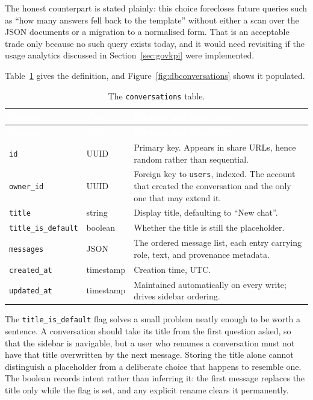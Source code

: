 The honest counterpart is stated plainly: this choice forecloses future queries such as
``how many answers fell back to the template'' without either a scan over the JSON documents
or a migration to a normalised form. That is an acceptable trade only because no such query
exists today, and it would need revisiting if the usage analytics discussed in
Section~\ref{sec:govkpi} were implemented.

Table~\ref{tab:convschema} gives the definition, and Figure~\ref{fig:dbconversations} shows
it populated.

\begin{longtable}{|p{}|p{}|p{}|}
\caption{The \texttt{conversations} table.}\label{tab:convschema}\\
\hline
\rowcolor{myblue}\textcolor{white}{\textbf{Column}} & \textcolor{white}{\textbf{Type}} & \textcolor{white}{\textbf{Purpose and constraints}} \\
\hline
\endfirsthead
\hline
\rowcolor{myblue}\textcolor{white}{\textbf{Column}} & \textcolor{white}{\textbf{Type}} & \textcolor{white}{\textbf{Purpose and constraints}} \\
\hline
\endhead
\texttt{id} & UUID & Primary key. Appears in share URLs, hence random rather than sequential. \\ \hline
\texttt{owner\_id} & UUID & Foreign key to \texttt{users}, indexed. The account that created the conversation and the only one that may extend it. \\ \hline
\texttt{title} & string & Display title, defaulting to ``New chat''. \\ \hline
\texttt{title\_is\_default} & boolean & Whether the title is still the placeholder. \\ \hline
\texttt{messages} & JSON & The ordered message list, each entry carrying role, text, and provenance metadata. \\ \hline
\texttt{created\_at} & timestamp & Creation time, UTC. \\ \hline
\texttt{updated\_at} & timestamp & Maintained automatically on every write; drives sidebar ordering. \\ \hline
\end{longtable}

The \texttt{title\_is\_default} flag solves a small problem neatly enough to be worth a
sentence. A conversation should take its title from the first question asked, so that the
sidebar is navigable, but a user who renames a conversation must not have that title
overwritten by the next message. Storing the title alone cannot distinguish a placeholder
from a deliberate choice that happens to resemble one. The boolean records intent rather
than inferring it: the first message replaces the title only while the flag is set, and any
explicit rename clears it permanently.

